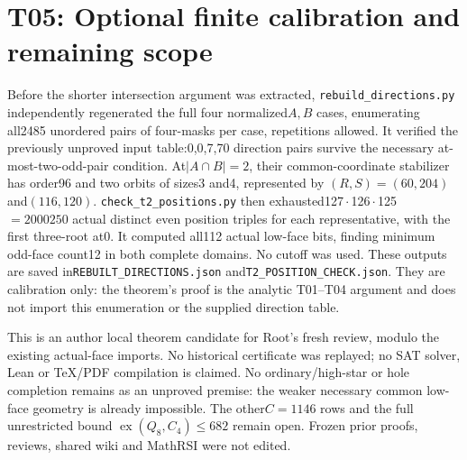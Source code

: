 \documentclass{article}
\begin{document}
\section{T05: Optional finite calibration and remaining scope}
Before the shorter intersection argument was extracted,
\texttt{rebuild\_directions.py} independently regenerated the full
four normalized$A,B$ cases, enumerating all2485 unordered pairs of
four-masks per case, repetitions allowed. It verified the previously
unproved input table:0,0,7,70 direction pairs survive the necessary
at-most-two-odd-pair condition. At$|A\cap B|=2$, their common-coordinate
stabilizer has order96 and two orbits of sizes3 and4, represented by
$(R,S)=(60,204)$ and$(116,120)$.
\texttt{check\_t2\_positions.py} then exhausted127\,$\cdot$\,126\,$\cdot$\,125
$=2000250$ actual distinct even position triples for each representative,
with the first three-root at0. It computed all112 actual low-face bits,
finding minimum odd-face count12 in both complete domains. No cutoff
was used. These outputs are saved in\texttt{REBUILT\_DIRECTIONS.json}
and\texttt{T2\_POSITION\_CHECK.json}. They are calibration only:
the theorem's proof is the analytic T01--T04 argument and does not
import this enumeration or the supplied direction table.

This is an author local theorem candidate for Root's fresh review,
modulo the existing actual-face imports. No historical certificate was
replayed; no SAT solver, Lean or TeX/PDF compilation is claimed.
No ordinary/high-star or hole completion remains as an unproved
premise: the weaker necessary common low-face geometry is already
impossible. The other$C=1146$ rows and the full unrestricted bound
$\operatorname{ex}(Q_8,C_4)\le682$ remain open. Frozen prior proofs,
reviews, shared wiki and MathRSI were not edited.
\end{document}
